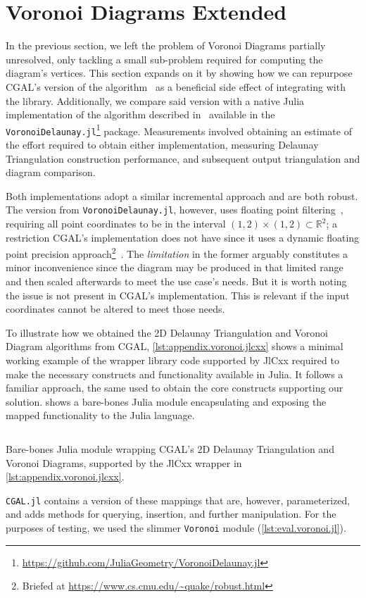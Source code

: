 \section{Voronoi Diagrams Extended}%
\label{sec:eval.voronoi}

In the previous section, we left the problem of Voronoi Diagrams partially
unresolved, only tackling a small sub-problem required for computing the
diagram's vertices.  This section expands on it by showing how we can repurpose
\ac{CGAL}'s version of the algorithm~\cite{CGAL:5.3:VDA2} as a beneficial side
effect of integrating with the library.  Additionally, we compare said version
with a native Julia implementation of the algorithm described
in~\cite{Springel:2010:GCHSMM} available in the
\texttt{VoronoiDelaunay.jl}\footnote{\url{https://github.com/JuliaGeometry/VoronoiDelaunay.jl}}
package.  Measurements involved obtaining an estimate of the effort required to
obtain either implementation, measuring Delaunay Triangulation construction
performance, and subsequent output triangulation and diagram comparison.

Both implementations adopt a similar incremental approach and are both robust.
The version from \texttt{VoronoiDelaunay.jl}, however, uses floating point
filtering~\cite{Springel:2010:GCHSMM}, requiring all point coordinates to be in
the interval $\left(1, 2\right) \times \left(1, 2\right) \subset \mathbb{R}^2$;
a restriction \ac{CGAL}'s implementation does not have since it uses a dynamic
floating point precision approach\footnote{Briefed at
\url{https://www.cs.cmu.edu/~quake/robust.html}}~\cite{Shewchuk:1997:APFPAFRGP}.
The \textit{limitation} in the former arguably constitutes a minor inconvenience
since the diagram may be produced in that limited range and then scaled
afterwards to meet the use case's needs.  But it is worth noting the issue is
not present in \ac{CGAL}'s implementation.  This is relevant if the input
coordinates cannot be altered to meet those needs.

To illustrate how we obtained the 2D Delaunay Triangulation and Voronoi Diagram
algorithms from \ac{CGAL}, \cref{lst:appendix.voronoi.jlcxx} shows a minimal
working example of the wrapper library code supported by JlCxx required to make
the necessary constructs and functionality available in Julia.  It follows a
familiar approach, the same used to obtain the core constructs supporting our
\primitives{} solution.   shows a bare-bones Julia
module encapsulating and exposing the mapped functionality to the Julia
language.
\begin{listing}[htb]
  \inputminted{julia}{jl/Voronoi.jl}
  \caption[Bare-bones Julia module wrapping CGAL's Delaunay algorithms]{
    Bare-bones Julia module wrapping \ac{CGAL}'s 2D Delaunay Triangulation and
    Voronoi Diagrams, supported by the JlCxx wrapper in
    \cref{lst:appendix.voronoi.jlcxx}.}%
  \label{lst:eval.voronoi.jl}
\end{listing}
\texttt{CGAL.jl} contains a version of these mappings that are, however,
parameterized, and adds methods for querying, insertion, and further
manipulation.  For the purposes of testing, we used the slimmer \texttt{Voronoi}
module (\cref{lst:eval.voronoi.jl}).

